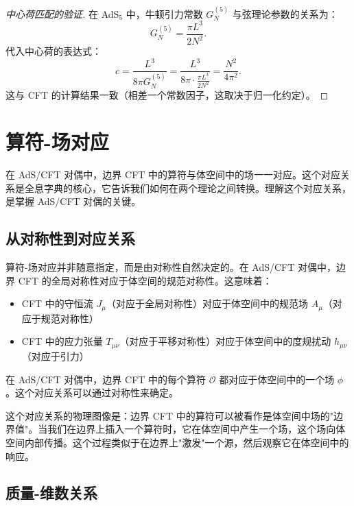 \begin{proof}[中心荷匹配的验证]
在 AdS$_5$ 中，牛顿引力常数 $G_N^{(5)}$ 与弦理论参数的关系为：
\begin{equation}
    G_N^{(5)} = \frac{\pi L^3}{2N^2}.
\end{equation}
代入中心荷的表达式：
\begin{equation}
    c = \frac{L^3}{8\pi G_N^{(5)}} = \frac{L^3}{8\pi \cdot \frac{\pi L^3}{2N^2}} = \frac{N^2}{4\pi^2}.
\end{equation}
这与 CFT 的计算结果一致（相差一个常数因子，这取决于归一化约定）。
\end{proof}

\section{算符-场对应}

在 AdS/CFT 对偶中，边界 CFT 中的算符与体空间中的场一一对应。这个对应关系是全息字典的核心，它告诉我们如何在两个理论之间转换。理解这个对应关系，是掌握 AdS/CFT 对偶的关键。

\subsection{从对称性到对应关系}

算符-场对应并非随意指定，而是由对称性自然决定的。在 AdS/CFT 对偶中，边界 CFT 的全局对称性对应于体空间的规范对称性。这意味着：
\begin{itemize}
    \item CFT 中的守恒流 $J_\mu$（对应于全局对称性）对应于体空间中的规范场 $A_\mu$（对应于规范对称性）
    \item CFT 中的应力张量 $T_{\mu\nu}$（对应于平移对称性）对应于体空间中的度规扰动 $h_{\mu\nu}$（对应于引力）
\end{itemize}

\begin{definition}[算符-场对应]
在 AdS/CFT 对偶中，边界 CFT 中的每个算符 $\mathcal{O}$ 都对应于体空间中的一个场 $\phi$。这个对应关系可以通过对称性来确定。
\end{definition}

这个对应关系的物理图像是：边界 CFT 中的算符可以被看作是体空间中场的"边界值"。当我们在边界上插入一个算符时，它在体空间中产生一个场，这个场向体空间内部传播。这个过程类似于在边界上"激发"一个源，然后观察它在体空间中的响应。

\subsection{质量-维数关系}

